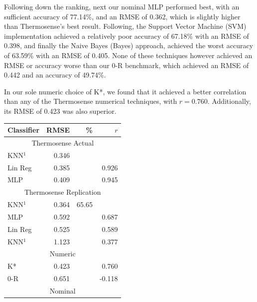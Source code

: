 \documentclass[../thesis/thesis.tex]{subfiles}
\begin{document}
Following down the ranking, next our nominal MLP performed best, with an sufficient accuracy of 77.14\%, and an RMSE of 0.362, which is slightly higher than Thermosense's best result. Following, the Support Vector Machine (SVM) implementation achieved a relatively poor accuracy of 67.18\% with an RMSE of 0.398, and finally the Naive Bayes (Bayes) approach, achieved the worst accuracy of 63.59\% with an RMSE of 0.405. None of these techniques however achieved an RMSE or accuracy worse than our 0-R benchmark, which achieved an RMSE of 0.442 and an accuracy of 49.74\%.

In our sole numeric choice of K*, we found that it achieved a better correlation than any of the Thermosense numerical techniques, with $r = 0.760$. Additionally, its RMSE of 0.423 was also superior.

\begin{table}
\centering
\begin{tabular}{|l|r|r|r|}
\hline
\textbf{Classifier} & \textbf{RMSE} & \textbf{\%} & \textbf{$r$} \\ \hline
\multicolumn{4}{|c|}{Thermosense Actual}                         \\ \hline
KNN$^1$             & 0.346         &             &              \\ \hline
Lin Reg             & 0.385         &             & 0.926        \\ \hline
MLP                 & 0.409         &             & 0.945        \\ \hline
\multicolumn{4}{|c|}{Thermosense Replication}                    \\ \hline
KNN$^1$             & 0.364         & 65.65       &              \\ \hline
MLP                 & 0.592         &             & 0.687        \\ \hline
Lin Reg             & 0.525         &             & 0.589        \\ \hline
KNN$^1$             & 1.123         &             & 0.377        \\ \hline
\multicolumn{4}{|c|}{Numeric}                                    \\ \hline
K*                  & 0.423         &             & 0.760        \\ \hline
0-R                 & 0.651         &             & -0.118       \\ \hline
\multicolumn{4}{|c|}{Nominal}                                    \\ \hline

\end{tabular}
\end{table}
\end{document}
